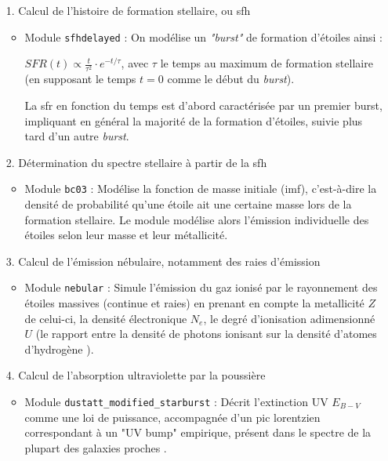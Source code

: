 \documentclass[12pt, a4paper]{article}
\begin{document}
\begin{itemize}
  \item[1.] Calcul de l'histoire de formation stellaire, ou \gls{sfh}
  \begin{itemize}
    \item Module \texttt{sfhdelayed} : On modélise un \textit{"burst"} de formation d'étoiles ainsi :
    
     $SFR(t) \propto \frac{t}{\tau^2} \cdot e^{-t/\tau}$, avec $\tau$ le temps au maximum de formation stellaire (en supposant le temps $t=0$ comme le début du \textit{burst}).

    La \gls{sfr} en fonction du temps est d'abord caractérisée par un premier burst, impliquant en général la majorité de la formation d'étoiles, suivie plus tard d'un autre \textit{burst}.
  \end{itemize}

  \item[2.] Détermination du spectre stellaire à partir de la \gls{sfh}
  \begin{itemize}
    \item Module \texttt{bc03} : Modélise la fonction de masse initiale (\gls{imf}), c'est-à-dire la densité de probabilité qu'une étoile ait une certaine masse lors de la formation stellaire. Le module modélise alors l'émission individuelle des étoiles selon leur masse et leur métallicité.
  \end{itemize}

  \item[3.] Calcul de l'émission nébulaire, notamment des raies d'émission
  \begin{itemize}
    \item Module \texttt{nebular} : Simule l'émission du gaz ionisé par le rayonnement des étoiles massives (continue et raies) en prenant en compte la metallicité $Z$ de celui-ci, la densité électronique $N_e$, le degré d'ionisation adimensionné $U$ (le rapport entre la densité de photons ionisant sur la densité d'atomes d'hydrogène \parencite{Astrophysics-of-the-Diffuse-Universe}).
  \end{itemize}

  \item[4.] Calcul de l'absorption ultraviolette par la poussière
  \begin{itemize}
    \item Module \texttt{dustatt\_modified\_starburst} : Décrit l'extinction UV $E_{B-V}$ comme une loi de puissance, accompagnée d'un pic lorentzien correspondant à un "UV bump" empirique, présent dans le spectre de la plupart des galaxies proches \parencite{10.1093/mnras/stac1313}.
  \end{itemize}


\end{itemize}
\end{document}
